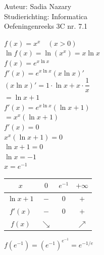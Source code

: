 \documentclass[a4paper]{article}
\begin{document}
  
\noindent \large Auteur: Sadia Nazary  \\
\noindent \large Studierichting: Informatica\\
\noindent \large Oefeningenreeks 3C nr. 7.1\\

\medskip

\normalsize

$f(x)=x^x \quad (x>0)$ \\

$\ln f(x)=\ln(x^x)=x\ln x$ \\

$f(x)=e^{x\ln x}$ \\

$f'(x)=e^{x\ln x}(x\ln x)'$ \\

$(x\ln x)'=1\cdot \ln x+x\cdot\dfrac{1}{x}$ \\

$=\ln x+1$ \\

$f'(x)=e^{x\ln x}(\ln x+1)$ \\

$=x^x(\ln x+1)$ \\

$f'(x)=0$ \\

$x^x(\ln x+1)=0$ \\

$\ln x+1=0$ \\

$\ln x=-1$ \\

$x=e^{-1}$ \\

\medskip

\begin{center}
\begin{tabular}{c|ccc}
$x$ & $0$ & $e^{-1}$ & $+\infty$ \\
\hline
$\ln x+1$ & $-$ & $0$ & $+$ \\
$f'(x)$ & $-$ & $0$ & $+$ \\
$f(x)$ & $\searrow$ & & $\nearrow$
\end{tabular}
\end{center}

$f(e^{-1})=(e^{-1})^{e^{-1}}=e^{-1/e}$ \\

\end{document}
